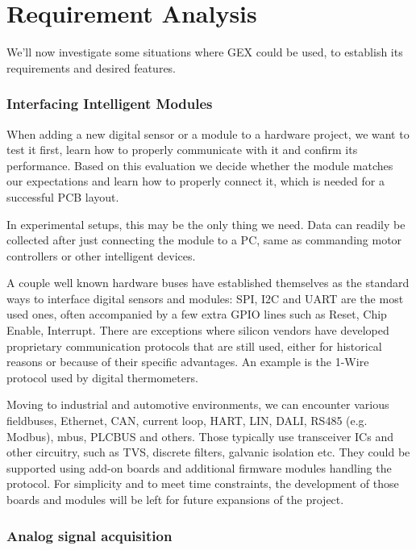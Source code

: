 \chapter{Requirement Analysis}

We'll now investigate some situations where GEX could be used, to establish its requirements and desired features. 

\subsection{\label{sec:uses-digital-ifaces}Interfacing Intelligent Modules}

When adding a new digital sensor or a module to a hardware project, we want to test it first, learn how to properly communicate with it and confirm its performance. Based on this evaluation we decide whether the module matches our expectations and learn how to properly connect it, which is needed for a successful PCB layout.

In experimental setups, this may be the only thing we need. Data can readily be collected after just connecting the module to a PC, same as commanding motor controllers or other intelligent devices.

A couple well known hardware buses have established themselves as the standard ways to interface digital sensors and modules: SPI, I2C and UART are the most used ones, often accompanied by a few extra GPIO lines such as Reset, Chip Enable, Interrupt. There are exceptions where silicon vendors have developed proprietary communication protocols that are still used, either for historical reasons or because of their specific advantages. An example is the 1-Wire protocol used by digital thermometers.

Moving to industrial and automotive environments, we can encounter various fieldbuses, Ethernet, CAN, current loop, HART, LIN, DALI, RS485 (e.g. Modbus), mbus, PLCBUS and others. Those typically use transceiver ICs and other circuitry, such as TVS, discrete filters, galvanic isolation etc. They could be supported using add-on boards and additional firmware modules handling the protocol. For simplicity and to meet time constraints, the development of those boards and modules will be left for future expansions of the project.

\subsection{Analog signal acquisition}

